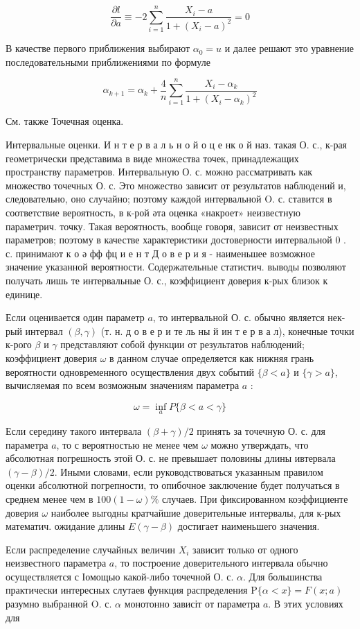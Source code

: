 \documentclass[10pt]{article}
\begin{document}
\[
\frac{\partial l}{\partial a} \equiv-2 \sum_{i=1}^{n} \frac{X_{i}-a}{1+\left(X_{i}-a\right)^{2}}=0
\]

В качестве первого приближения выбирают $\alpha_{0}=u$ и далее решают это уравнение последовательными приближениями по формуле

\[
\alpha_{k+1}=\alpha_{k}+\frac{4}{n} \sum_{i=1}^{n} \frac{X_{i}-\alpha_{k}}{1+\left(X_{i}-\alpha_{k}\right)^{2}}
\]

См. также Точечная оценка.

Интервальные оценки. И н т е р в а л ь н о й о ц е нк о й наз. такая О. с., к-рая геометрически представима в виде множества точек, принадлежащих пространству параметров. Интервальную О. с. можно рассматривать как множество точечных О. с. Это множество зависит от результатов наблюдений и, следовательно, оно случайно; поэтому каждой интервальной $\mathrm{O}$. с. ставится в соответствие вероятность, в к-рой әта оценка «накроет» неизвестную параметрич. точку. Такая вероятность, вообще говоря, зависит от неизвестных параметров; поэтому в качестве характеристики достоверности интервальной 0 . с. принимают к о ә фф фц и е н т Д о в е р и я - наименьшее возможное значение указанной вероятности. Содержательные статистич. выводы позволяют получать лишь те интервальные О. с., коэффициент доверия к-рых близок к единице.

Если оценивается один параметр $a$, то интервальной О. с. обычно является нек-рый интервал $(\beta, \gamma)$ (т. н. д о в е р и те ль ны й ин т е р в а л), конечные точки к-рого $\beta$ и $\gamma$ представляют собой функции от результатов наблюдений; коэффициент доверия $\omega$ в данном случае определяется как нижняя грань вероятности одновременного осуществления двух событий $\{\beta<a\}$ и $\{\gamma>a\}$, вычисляемая по всем возможным значениям параметра $a$ :

\[
\omega=\inf _{a} P\{\beta<a<\gamma\}
\]

Если середину такого интервала $(\beta+\gamma) / 2$ принять за точечную О. с. для параметра $a$, то с вероятностью не менее чем $\omega$ можно утверждать, что абсолютная погрешность этой $О$. с. не превышает половины длины ивтервала $(\gamma-\beta) / 2$. Иными словами, если руководствоваться указанным правилом оценки абсолютной погрепности, то опибочное заключение будет получаться в среднем менее чем в $100(1-\omega) \%$ случаев. При фиксированном коэффициенте доверия $\omega$ наиболее выгодны кратчайшие доверительные интервалы, для к-рых математич. ожидание длины $E(\gamma-\beta)$ достигает наименьшего значения.

Если распределение случайных величин $X_{i}$ зависит только от одного неизвестного параметра $a$, то построение доверительного интервала обычно осуществляется с Іомощью какой-либо точечной О. с. $\alpha$. Для большинства практически интересных слутаев функция распределения $\mathrm{P}\{\alpha<x\}=F(x ; a)$ разумно выбранной $\mathrm{O}$. с. $\alpha$ монотонно зависіт от параметра $a$. В этих условиях для
\end{document}
